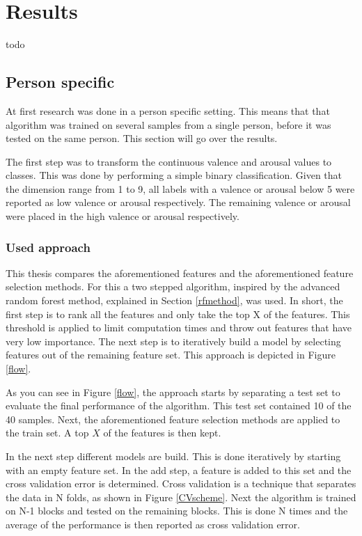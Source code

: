 \chapter{Results}
{\samenvatting todo}
\section{Person specific}
At first research was done in a person specific setting. This means that that algorithm was trained on several samples from a single person, before it was tested on the same person.
This section will go over the results.

\npar

The first step was to transform the continuous valence and arousal values to classes. This was done by performing a simple binary classification. Given that the dimension range from 1 to 9, all labels with a valence or arousal below 5 were reported as low valence or arousal respectively. The remaining valence or arousal were placed in the high valence or arousal respectively.

\subsection{Used approach}

This thesis compares the aforementioned features and the aforementioned feature selection methods. For this a two stepped algorithm, inspired by the advanced random forest method, explained in Section \ref{rfmethod}, was used. In short, the first step is to rank all the features and only take the top X of the features. This threshold is applied to limit computation times and throw out features that have very low importance. The next step is to iteratively build a model by selecting features out of the remaining feature set. This approach is depicted in Figure \ref{flow}.


As you can see in Figure \ref{flow}, the approach starts by separating a test set to evaluate the final performance of the algorithm. This test set contained 10 of the 40 samples. Next, the aforementioned feature selection methods are applied to the train set. A top $X$ of the features is then kept.

\npar

In the next step different models are build. This is done iteratively by starting with an empty feature set. In the add step, a feature is added to this set and the cross validation error is determined. Cross validation is a technique that separates the data in N folds, as shown in Figure \ref{CVscheme}. Next the algorithm is trained on N-1 blocks and tested on the remaining blocks. This is done N times and the average of the performance is then reported as cross validation error. 

